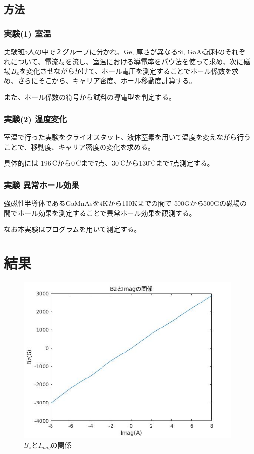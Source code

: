 \documentclass[dvipdfmx]{jsarticle}
\begin{document}
\subsection{方法}
\subsubsection{実験(1) 室温}
実験班5人の中で２グループに分かれ、Ge, 厚さが異なるSi, GaAs試料のそれぞれについて、電流$I_{\rm{x}}$を流し、室温における導電率をパウ法を使って求め、次に磁場$B_{\rm{z}}$を変化させながらかけて、ホール電圧を測定することでホール係数を求め、さらにそこから、キャリア密度、ホール移動度計算する。

また、ホール係数の符号から試料の導電型を判定する。


\subsubsection{実験(2) 温度変化}
室温で行った実験をクライオスタット、液体窒素を用いて温度を変えながら行うことで、移動度、キャリア密度の変化を求める。

具体的には-196℃から0℃まで7点、30℃から130℃まで7点測定する。


\subsubsection{実験 異常ホール効果}

強磁性半導体であるGaMnAsを4Kから100Kまでの間で-500Gから500Gの磁場の間でホール効果を測定することで異常ホール効果を観測する。

なお本実験はプログラムを用いて測定する。
\section{結果}

\begin{figure}[H]
\begin{center}
\includegraphics[scale = 0.7]{ImagBz.jpg}
\caption{$B_{z}$と$I_{mag}$の関係}
\end{center}
\end{figure}
\end{document}
